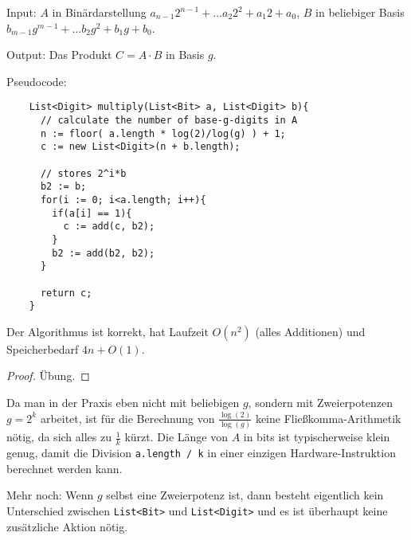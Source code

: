 \begin{algorithm}
    \label{alg:double-and-add}
    Input: $A$ in Binärdarstellung $a_{n-1}2^{n-1}+\ldots a_{2}2^2 +a_1 2 + a_0$, $B$ in beliebiger Basis $b_{m-1} g^{m-1} + \ldots b_2 g^2 + b_1 g+b_0$.

    Output: Das Produkt $C=A\cdot B$ in Basis $g$.

    Pseudocode:
    \begin{lstlisting}
    List<Digit> multiply(List<Bit> a, List<Digit> b){
      // calculate the number of base-g-digits in A
      n := floor( a.length * log(2)/log(g) ) + 1;
      c := new List<Digit>(n + b.length);

      // stores 2^i*b
      b2 := b;
      for(i := 0; i<a.length; i++){
        if(a[i] == 1){
          c := add(c, b2);
        }
        b2 := add(b2, b2);
      }

      return c;
    }
    \end{lstlisting}
\end{algorithm}

\begin{proposition}
    \label{alg:double-and-add:correctness}
    Der Algorithmus ist korrekt, hat Laufzeit $O(n^2)$ (alles Additionen) und Speicherbedarf $4n+O(1)$.
\end{proposition}
\begin{proof}
    Übung.
\end{proof}

\begin{remark}
    Da man in der Praxis eben nicht mit beliebigen $g$, sondern mit Zweierpotenzen $g=2^k$ arbeitet, ist für die Berechnung von $\frac{\log(2)}{\log(g)}$ keine Fließkomma-Arithmetik nötig, da sich alles zu $\frac{1}{k}$ kürzt. Die Länge von $A$ in bits ist typischerweise klein genug, damit die Division \texttt{a.length / k} in einer einzigen Hardware-Instruktion berechnet werden kann.

    \smallskip
    Mehr noch: Wenn $g$ selbst eine Zweierpotenz ist, dann besteht eigentlich kein Unterschied zwischen \texttt{List<Bit>} und \texttt{List<Digit>} und es ist überhaupt keine zusätzliche Aktion nötig.
\end{remark}
